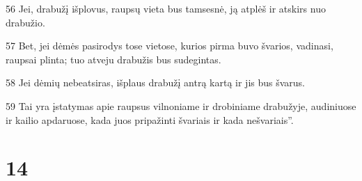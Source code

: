 \par 56 Jei, drabužį išplovus, raupsų vieta bus tamsesnė, ją atplėš ir atskirs nuo drabužio. 
\par 57 Bet, jei dėmės pasirodys tose vietose, kurios pirma buvo švarios, vadinasi, raupsai plinta; tuo atveju drabužis bus sudegintas. 
\par 58 Jei dėmių nebeatsiras, išplaus drabužį antrą kartą ir jis bus švarus. 
\par 59 Tai yra įstatymas apie raupsus vilnoniame ir drobiniame drabužyje, audiniuose ir kailio apdaruose, kada juos pripažinti švariais ir kada nešvariais”.



\chapter{14}


